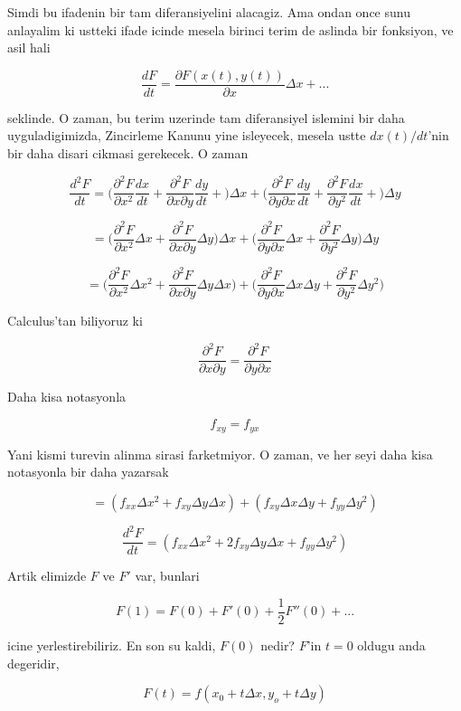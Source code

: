 \documentclass[12pt,fleqn]{article}
\begin{document}
Simdi bu ifadenin bir tam diferansiyelini alacagiz. Ama ondan once sunu
anlayalim ki ustteki ifade icinde mesela birinci terim de aslinda bir
fonksiyon, ve asil hali

\[ \frac{dF}{dt} = \frac{\partial F(x(t),y(t))}{\partial x}\Delta x + ...
 \]

seklinde. O zaman, bu terim uzerinde tam diferansiyel islemini bir daha
uyguladigimizda, Zincirleme Kanunu yine isleyecek, mesela ustte $dx(t)/dt$'nin 
bir daha disari cikmasi gerekecek. O zaman 

\[ \frac{d^2F}{dt} =
\bigg(
\frac{\partial ^2 F}{\partial x^2}\frac{dx}{dt} + 
\frac{\partial ^2 F}{\partial x \partial y}\frac{dy}{dt} + 
\bigg) \Delta x +
\bigg(
\frac{\partial ^2 F}{\partial y \partial x}\frac{dy}{dt} + 
\frac{\partial ^2 F}{\partial y^2}\frac{dx}{dt} + 
\bigg) \Delta y 
\]

\[ =
\bigg(
\frac{\partial ^2 F}{\partial x^2}\Delta x + 
\frac{\partial ^2 F}{\partial x \partial y}\Delta y 
\bigg) \Delta x +
\bigg(
\frac{\partial ^2 F}{\partial y \partial x}\Delta x + 
\frac{\partial ^2 F}{\partial y^2}\Delta y 
\bigg) \Delta y 
 \]

\[ =
\bigg(
\frac{\partial ^2 F}{\partial x^2}\Delta x^2 + 
\frac{\partial ^2 F}{\partial x \partial y}\Delta y \Delta x
\bigg) +
\bigg(
\frac{\partial ^2 F}{\partial y \partial x}\Delta x \Delta y + 
\frac{\partial ^2 F}{\partial y^2}\Delta y^2
\bigg) 
 \]

Calculus'tan biliyoruz ki 

\[ 
\frac{\partial ^2 F}{\partial x \partial y} = 
\frac{\partial ^2 F}{\partial y \partial x} 
 \]

Daha kisa notasyonla

\[ f_{xy} = f_{yx} \]

Yani kismi turevin alinma sirasi farketmiyor. O zaman, ve her seyi daha
kisa notasyonla bir daha yazarsak

\[ =
(f_{xx}\Delta x^2 + f_{xy}\Delta y \Delta x ) +
(f_{xy}\Delta x \Delta y + f_{yy}\Delta y^2 )
 \]

\[
\frac{d^2F}{dt}  =
(f_{xx}\Delta x^2 + 2f_{xy}\Delta y \Delta x + f_{yy}\Delta y^2 )
 \]

Artik elimizde $F$ ve $F'$ var, bunlari 

\[ F(1) = F(0) + F'(0) + \frac{1}{2}F''(0) + ... \]

icine yerlestirebiliriz. En son su kaldi, $F(0)$ nedir? $F$'in $t=0$ oldugu
anda degeridir, 

\[ F(t) = f(x_0 + t\Delta x, y_o + t\Delta y) \]
\end{document}
